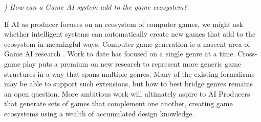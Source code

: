 \documentclass[conference]{IEEEtran}
\newcounter{questionno}
\newcommand{\subsubsectionx}[1]{{\em {\arabic{questionno}) #1}}
	\addtocounter{questionno}{1}
	}
\begin{document}
\subsubsectionx{How can a Game AI system add to the game ecosystem?}
%
If AI as producer focuses on an ecosystem of computer games, we might ask whether intelligent systems can automatically create new games that add to the ecosystem in meaningful ways.
Computer game generation is a nascent area of Game AI research \cite{togelius2008:gamegen, smith2010:variations, cook2012:coopcoevo, hartsook2011:gameforge}.
Work to date has focused on a single genre at a time. 
Cross-game play puts a premium on new research to represent more generic game structures in a way that spans multiple genres. Many of the existing formalisms may be able to support such extensions, but how to best bridge genres remains an open question.
More ambitious work will ultimately aspire to AI Producers that generate sets of games that complement one another, creating game ecosystems using a wealth of accumulated design knowledge.

\end{document}
